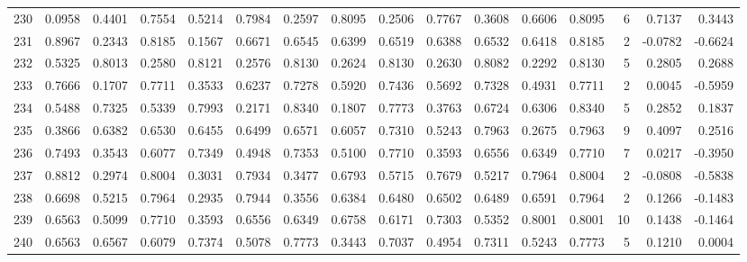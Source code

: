 \begin{tabular}{lrrrrrrrrrrrrrrr}
230 &      0.0958 &  0.4401 &  0.7554 &  0.5214 &  0.7984 &  0.2597 &  0.8095 &  0.2506 &  0.7767 &  0.3608 &   0.6606 &     0.8095 &      6 &                    0.7137 &                     0.3443 \\
231 &      0.8967 &  0.2343 &  0.8185 &  0.1567 &  0.6671 &  0.6545 &  0.6399 &  0.6519 &  0.6388 &  0.6532 &   0.6418 &     0.8185 &      2 &                   -0.0782 &                    -0.6624 \\
232 &      0.5325 &  0.8013 &  0.2580 &  0.8121 &  0.2576 &  0.8130 &  0.2624 &  0.8130 &  0.2630 &  0.8082 &   0.2292 &     0.8130 &      5 &                    0.2805 &                     0.2688 \\
233 &      0.7666 &  0.1707 &  0.7711 &  0.3533 &  0.6237 &  0.7278 &  0.5920 &  0.7436 &  0.5692 &  0.7328 &   0.4931 &     0.7711 &      2 &                    0.0045 &                    -0.5959 \\
234 &      0.5488 &  0.7325 &  0.5339 &  0.7993 &  0.2171 &  0.8340 &  0.1807 &  0.7773 &  0.3763 &  0.6724 &   0.6306 &     0.8340 &      5 &                    0.2852 &                     0.1837 \\
235 &      0.3866 &  0.6382 &  0.6530 &  0.6455 &  0.6499 &  0.6571 &  0.6057 &  0.7310 &  0.5243 &  0.7963 &   0.2675 &     0.7963 &      9 &                    0.4097 &                     0.2516 \\
236 &      0.7493 &  0.3543 &  0.6077 &  0.7349 &  0.4948 &  0.7353 &  0.5100 &  0.7710 &  0.3593 &  0.6556 &   0.6349 &     0.7710 &      7 &                    0.0217 &                    -0.3950 \\
237 &      0.8812 &  0.2974 &  0.8004 &  0.3031 &  0.7934 &  0.3477 &  0.6793 &  0.5715 &  0.7679 &  0.5217 &   0.7964 &     0.8004 &      2 &                   -0.0808 &                    -0.5838 \\
238 &      0.6698 &  0.5215 &  0.7964 &  0.2935 &  0.7944 &  0.3556 &  0.6384 &  0.6480 &  0.6502 &  0.6489 &   0.6591 &     0.7964 &      2 &                    0.1266 &                    -0.1483 \\
239 &      0.6563 &  0.5099 &  0.7710 &  0.3593 &  0.6556 &  0.6349 &  0.6758 &  0.6171 &  0.7303 &  0.5352 &   0.8001 &     0.8001 &     10 &                    0.1438 &                    -0.1464 \\
240 &      0.6563 &  0.6567 &  0.6079 &  0.7374 &  0.5078 &  0.7773 &  0.3443 &  0.7037 &  0.4954 &  0.7311 &   0.5243 &     0.7773 &      5 &                    0.1210 &                     0.0004 \\

\end{tabular}
